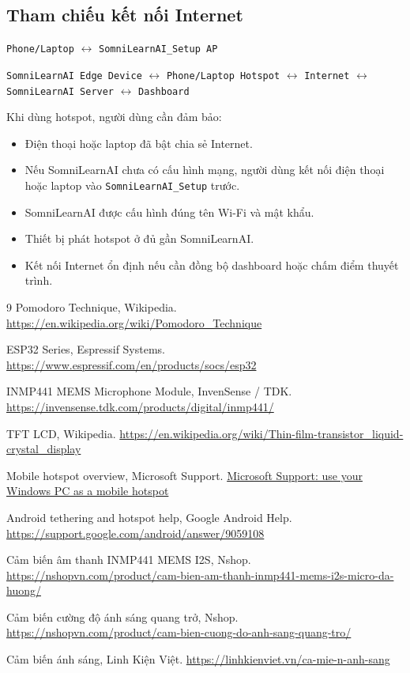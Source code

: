 \documentclass[12pt,a4paper]{article}
\begin{document}
\subsection{Tham chiếu kết nối Internet}

\begin{center}
\texttt{Phone/Laptop} $\leftrightarrow$ \texttt{SomniLearnAI\_Setup AP}

\texttt{SomniLearnAI Edge Device} $\leftrightarrow$ \texttt{Phone/Laptop Hotspot} $\leftrightarrow$ \texttt{Internet} $\leftrightarrow$ \texttt{SomniLearnAI Server} $\leftrightarrow$ \texttt{Dashboard}
\end{center}

Khi dùng hotspot, người dùng cần đảm bảo:

\begin{itemize}
    \item Điện thoại hoặc laptop đã bật chia sẻ Internet.
    \item Nếu SomniLearnAI chưa có cấu hình mạng, người dùng kết nối điện thoại hoặc laptop vào \texttt{SomniLearnAI\_Setup} trước.
    \item SomniLearnAI được cấu hình đúng tên Wi-Fi và mật khẩu.
    \item Thiết bị phát hotspot ở đủ gần SomniLearnAI.
    \item Kết nối Internet ổn định nếu cần đồng bộ dashboard hoặc chấm điểm thuyết trình.
\end{itemize}

\sloppy
\begin{thebibliography}{9}
Pomodoro Technique, Wikipedia. \url{https://en.wikipedia.org/wiki/Pomodoro_Technique}

ESP32 Series, Espressif Systems. \url{https://www.espressif.com/en/products/socs/esp32}

INMP441 MEMS Microphone Module, InvenSense / TDK. \url{https://invensense.tdk.com/products/digital/inmp441/}

TFT LCD, Wikipedia. \url{https://en.wikipedia.org/wiki/Thin-film-transistor_liquid-crystal_display}

Mobile hotspot overview, Microsoft Support. \href{https://support.microsoft.com/windows/use-your-windows-pc-as-a-mobile-hotspot-c89b0fad-72d5-41e8-f7ea-406ad9036b85}{Microsoft Support: use your Windows PC as a mobile hotspot}

Android tethering and hotspot help, Google Android Help. \url{https://support.google.com/android/answer/9059108}

Cảm biến âm thanh INMP441 MEMS I2S, Nshop. \url{https://nshopvn.com/product/cam-bien-am-thanh-inmp441-mems-i2s-micro-da-huong/}

Cảm biến cường độ ánh sáng quang trở, Nshop. \url{https://nshopvn.com/product/cam-bien-cuong-do-anh-sang-quang-tro/}

Cảm biến ánh sáng, Linh Kiện Việt. \url{https://linhkienviet.vn/ca-mie-n-anh-sang}
\end{thebibliography}
\end{document}
